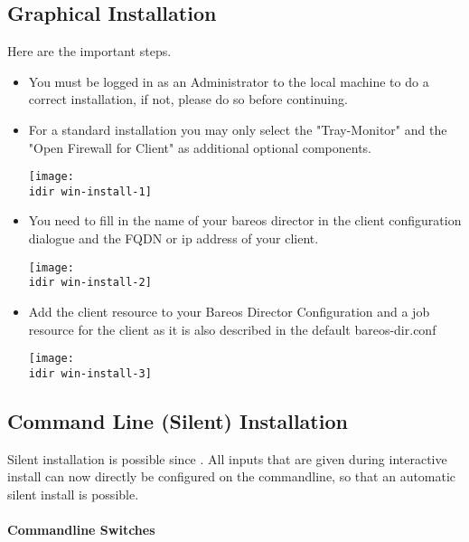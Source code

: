 \subsection{Graphical Installation}

Here are the important steps.

\begin{itemize}
    \item You must be logged in as an Administrator to the local machine
    to do a correct installation, if not, please do so before continuing.
    \item For a standard installation you may only select the "Tray-Monitor"
    and the "Open Firewall for Client" as additional optional components.
    \begin{center}
    \texttt{[image: \\idir win-install-1]}
    \end{center}

    \item You need to fill in the name of your bareos director in the client configuration
    dialogue and the FQDN or ip address of your client.
    \begin{center}
    \texttt{[image: \\idir win-install-2]}
    \end{center}

    \item Add the client resource to your Bareos Director Configuration and a
    job resource for the client as it is also described in the default bareos-dir.conf
    \begin{center}
    \texttt{[image: \\idir win-install-3]}
    \end{center}
\end{itemize}

\subsection{Command Line (Silent) Installation}

Silent installation is possible since .
All inputs that are given during interactive install can now directly be configured on the
commandline, so that an automatic silent install is possible.

\paragraph{Commandline Switches}

